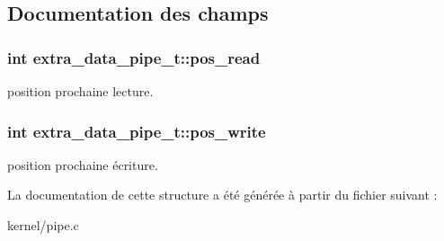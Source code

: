 \subsection{Documentation des champs}
\hypertarget{structextra__data__pipe__t_ab5099bb3254b99c3601d267528cd4dc1}{
\subsubsection[{pos\-\_\-read}]{\setlength{\rightskip}{0pt plus 5cm}int extra\-\_\-data\-\_\-pipe\-\_\-t\-::pos\-\_\-read}}\label{structextra__data__pipe__t_ab5099bb3254b99c3601d267528cd4dc1}
position prochaine lecture. \hypertarget{structextra__data__pipe__t_a78f132f3076f0dc6ad7473d9361476c9}{
\subsubsection[{pos\-\_\-write}]{\setlength{\rightskip}{0pt plus 5cm}int extra\-\_\-data\-\_\-pipe\-\_\-t\-::pos\-\_\-write}}\label{structextra__data__pipe__t_a78f132f3076f0dc6ad7473d9361476c9}
position prochaine écriture. 

La documentation de cette structure a été générée à partir du fichier suivant \-:\begin{DoxyCompactItemize}
\item 
kernel/pipe.\-c\end{DoxyCompactItemize}
